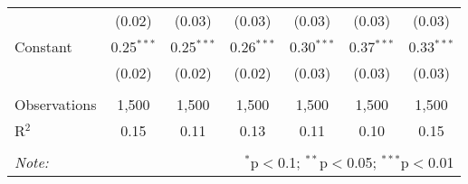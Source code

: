 \documentclass[
]{article}
\begin{document}
\begin{sidewaystable}[!htbp]
\begin{tabular}{@{\extracolsep{1pt}}lcccccc}
  & (0.02) & (0.03) & (0.03) & (0.03) & (0.03) & (0.03) \\ 
  Constant & 0.25$^{***}$ & 0.25$^{***}$ & 0.26$^{***}$ & 0.30$^{***}$ & 0.37$^{***}$ & 0.33$^{***}$ \\ 
  & (0.02) & (0.02) & (0.02) & (0.03) & (0.03) & (0.03) \\ 
 \hline \\[-1.8ex] 
Observations & 1,500 & 1,500 & 1,500 & 1,500 & 1,500 & 1,500 \\ 
R$^{2}$ & 0.15 & 0.11 & 0.13 & 0.11 & 0.10 & 0.15 \\ 
\hline 
\hline \\[-1.8ex] 
\textit{Note:}  & \multicolumn{6}{r}{$^{*}$p$<$0.1; $^{**}$p$<$0.05; $^{***}$p$<$0.01} \\ 
\end{tabular} 
\end{sidewaystable}
\end{document}
